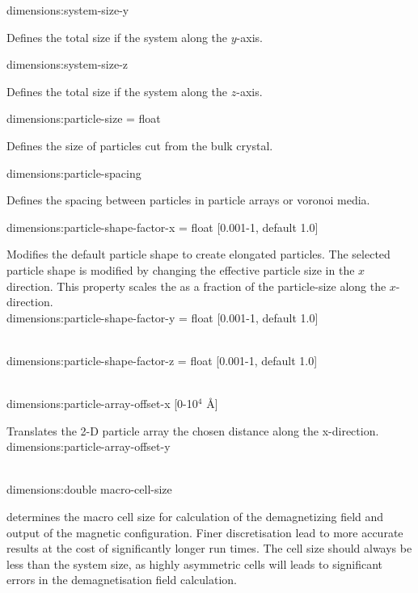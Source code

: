{\zicf dimensions:system-size-y} Defines the total size if the system along the $y$-axis.\\ \par

{\zicf dimensions:system-size-z} Defines the total size if the system along the $z$-axis.\\ \par

{\zicf dimensions:particle-size = float} Defines the size of particles cut from the bulk crystal.\\ \par

{\zicf dimensions:particle-spacing} Defines the spacing between particles in particle arrays or voronoi media.\\ \par


{\zicf dimensions:particle-shape-factor-x = float [0.001-1, default 1.0]} Modifies the default particle shape to create elongated particles. The selected particle shape is modified by changing the effective particle size in the $x$ direction. This property scales the as a fraction of the particle-size along the $x$-direction.\\

{\zicf dimensions:particle-shape-factor-y = float [0.001-1, default 1.0]}\\

{\zicf dimensions:particle-shape-factor-z = float [0.001-1, default 1.0]}\\

{\zicf dimensions:particle-array-offset-x [0-10$^4$ \AA]} Translates the 2-D particle array the chosen distance along the x-direction.\\

{\zicf dimensions:particle-array-offset-y}\\

{\zicf dimensions:double macro-cell-size} determines the macro cell size for calculation of the demagnetizing field and output of the magnetic configuration. Finer discretisation lead to more accurate results at the cost of significantly longer run times. The cell size should always be less than the system size, as highly asymmetric cells will leads to significant errors in the demagnetisation field calculation.

